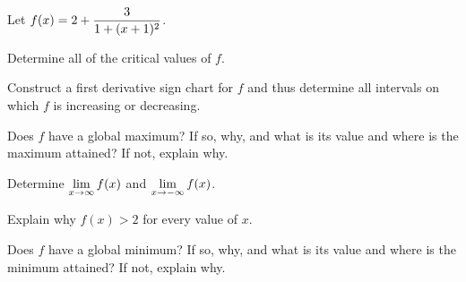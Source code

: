 \begin{pa} \label{PA:3.3}
Let $\displaystyle f(x) = 2 + \frac{3}{1+(x+1)^2}$.
\ba
	\item Determine all of the critical values of $f$.
	\item Construct a first derivative sign chart for $f$ and thus determine all intervals on which $f$ is increasing or decreasing.
	\item Does $f$ have a global maximum?  If so, why, and what is its value and where is the maximum attained?  If not, explain why.
	\item Determine $\displaystyle \lim_{x \to \infty} f(x)$ and $\displaystyle \lim_{x \to -\infty} f(x)$.
	\item Explain why $f(x) > 2$ for every value of $x$.
	\item Does $f$ have a global minimum?  If so, why, and what is its value and where is the minimum attained?  If not, explain why.
\ea
\end{pa} \afterpa